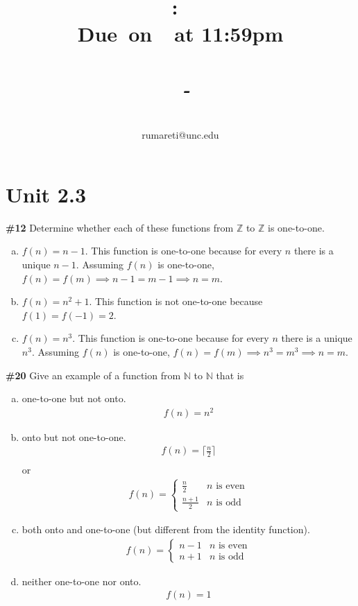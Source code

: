 \documentclass{article}
\title{
    \vspace{2in}
    \textmd{\textbf{\hmwkClass:\ \hmwkTitle}}\\
    \normalsize\vspace{0.1in}\small{\textbf{Due\ on\ \hmwkDueDate\ at 11:59pm}}\\
    \normalsize\text{Tuesday/Thursday 11:00-12:15, Phillips 383}\\
    \vspace{0.1in}\large{\textit{\hmwkClassInstructor\ - \hmwkClassTime}}
    \vspace{3in}
}
\author{\hmwkAuthorName\\\small{rumareti@unc.edu}}
\date{}
\newcommand{\unit}[1]{\section{Unit #1}}
\newcommand{\problem}[1]{\textbf{\##1}}
\newcommand{\prob}[1]{\problem{#1}}
\newcommand{\AllIntegers}{\mathbb{Z}}
\newcommand{\AllNaturals}{\mathbb{N}}
\begin{document}
\maketitle

\pagebreak
\unit{2.3}
\prob{12} Determine whether each of these functions from \(\AllIntegers\) to \(\AllIntegers\) is one-to-one.
\begin{enumerate}[a)]
    \item \(f(n) = n - 1\).
    This function is one-to-one because for every \(n\) there is a unique \(n-1\). Assuming \(f(n)\) is one-to-one, \(f(n) = f(m) \implies n-1 = m-1 \implies n = m\).
    \item \(f(n) = n^2 + 1\).
    This function is not one-to-one because \(f(1) = f(-1) = 2\).
    \item \(f(n) = n^3\).
    This function is one-to-one because for every \(n\) there is a unique \(n^3\). Assuming \(f(n)\) is one-to-one, \(f(n) = f(m) \implies n^3 = m^3 \implies n = m\).
\end{enumerate}
\pagebreak

\prob{20} Give an example of a function from \(\AllNaturals\) to \(\AllNaturals\) that is

\begin{enumerate}[a)]
    \item one-to-one but not onto.
    \begin{align*}
        f(n) = n^2
    \end{align*}
    \item onto but not one-to-one.
    \begin{align*}
        f(n) = \lceil \frac{n}{2} \rceil\\
    \end{align*}
    or
    \begin{align*}
        f(n) = \begin{cases}
            \frac{n}{2} & n \text{ is even}\\
            \frac{n+1}{2} & n \text{ is odd}
        \end{cases}
    \end{align*}
    \item both onto and one-to-one (but different from the identity function).
    \begin{align*}
        f(n) = \begin{cases}
            n-1 & n \text{ is even}\\
            n+1 & n \text{ is odd}
        \end{cases}
    \end{align*}
    \item neither one-to-one nor onto.
    \begin{align*}
        f(n) = 1
    \end{align*}
\end{enumerate}
\end{document}
